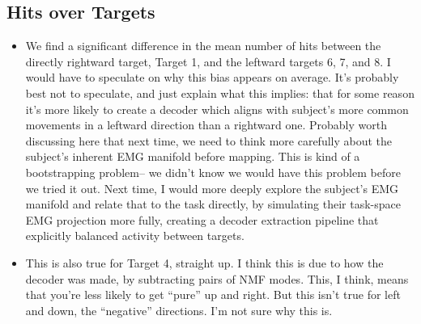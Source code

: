 \documentclass[../main.tex]{subfiles}
\begin{document}


\subsection{Hits over Targets}

\begin{itemize}
    \setlength\itemsep{0em}
    \item We find a significant difference in the mean number of hits between the directly rightward target, Target 1, and the leftward targets 6, 7, and 8. I would have to speculate on why this bias appears on average. It's probably best not to speculate, and just explain what this implies: that for some reason it's more likely to create a decoder which aligns with subject's more common movements in a leftward direction than a rightward one. Probably worth discussing here that next time, we need to think more carefully about the subject's inherent EMG manifold before mapping. This is kind of a bootstrapping problem-- we didn't know we would have this problem before we tried it out. Next time, I would more deeply explore the subject's EMG manifold and relate that to the task directly, by simulating their task-space EMG projection more fully, creating a decoder extraction pipeline that explicitly balanced activity between targets. 
    \item This is also true for Target 4, straight up. I think this is due to how the decoder was made, by subtracting pairs of NMF modes. This, I think, means that you're less likely to get ``pure'' up and right. But this isn't true for left and down, the ``negative'' directions. I'm not sure why this is.
\end{itemize}
\end{document}

